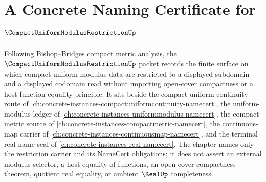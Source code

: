 \chapter{A Concrete Naming Certificate for $\CompactUniformModulusRestrictionUp$}
\label{ch:concrete-instances-compact-uniform-modulus-restriction-namecert}

Following Bishop--Bridges compact metric analysis, the $\CompactUniformModulusRestrictionUp$ packet records the finite surface on which compact-uniform modulus data are restricted to a displayed subdomain and a displayed codomain read without importing open-cover compactness or a host function-equality principle. It sits beside the compact-uniform-continuity route of \autoref{ch:concrete-instances-compactuniformcontinuity-namecert}, the uniform-modulus ledger of \autoref{ch:concrete-instances-uniformmodulus-namecert}, the compact-metric source of \autoref{ch:concrete-instances-compactmetric-namecert}, the continuous-map carrier of \autoref{ch:concrete-instances-continuousmap-namecert}, and the terminal real-name seal of \autoref{ch:concrete-instances-real-namecert}. The chapter names only the restriction carrier and its NameCert obligations; it does not assert an external modulus selector, a host equality of functions, an open-cover compactness theorem, quotient real equality, or ambient $\RealUp$ completeness.

